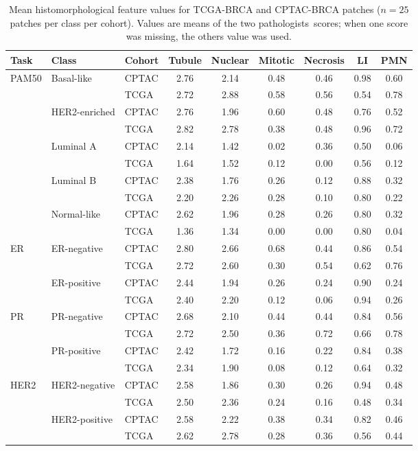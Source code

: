 \begin{table}[htbp]
\tiny
\centering
\caption{Mean histomorphological feature values for TCGA-BRCA and CPTAC-BRCA patches ($n=25$ patches per class per cohort). Values are means of the two pathologists\textquotesingle\ scores; when one score was missing, the other\textquotesingle s value was used.}
\label{tab:both-cohorts-means}
\begin{tabular}{lllcccccc}
\toprule
\textbf{Task} & \textbf{Class} & \textbf{Cohort} & \textbf{Tubule} & \textbf{Nuclear} & \textbf{Mitotic} & \textbf{Necrosis} & \textbf{LI} & \textbf{PMN} \\
\midrule
 \multirow{10}{*}{PAM50} & \multirow{2}{*}{Basal-like} & CPTAC & 2.76 & 2.14 & 0.48 & 0.46 & 0.98 & 0.60 \\
  &  & TCGA & 2.72 & 2.88 & 0.58 & 0.56 & 0.54 & 0.78 \\
   & \multirow{2}{*}{HER2-enriched} & CPTAC & 2.76 & 1.96 & 0.60 & 0.48 & 0.76 & 0.52 \\
  &  & TCGA & 2.82 & 2.78 & 0.38 & 0.48 & 0.96 & 0.72 \\
   & \multirow{2}{*}{Luminal A} & CPTAC & 2.14 & 1.42 & 0.02 & 0.36 & 0.50 & 0.06 \\
  &  & TCGA & 1.64 & 1.52 & 0.12 & 0.00 & 0.56 & 0.12 \\
   & \multirow{2}{*}{Luminal B} & CPTAC & 2.38 & 1.76 & 0.26 & 0.12 & 0.88 & 0.32 \\
  &  & TCGA & 2.20 & 2.26 & 0.28 & 0.10 & 0.80 & 0.22 \\
   & \multirow{2}{*}{Normal-like} & CPTAC & 2.62 & 1.96 & 0.28 & 0.26 & 0.80 & 0.32 \\
  &  & TCGA & 1.36 & 1.34 & 0.00 & 0.00 & 0.80 & 0.04 \\
\midrule
 \multirow{4}{*}{ER} & \multirow{2}{*}{ER-negative} & CPTAC & 2.80 & 2.66 & 0.68 & 0.44 & 0.86 & 0.54 \\
  &  & TCGA & 2.72 & 2.60 & 0.30 & 0.54 & 0.62 & 0.76 \\
   & \multirow{2}{*}{ER-positive} & CPTAC & 2.44 & 1.94 & 0.26 & 0.24 & 0.90 & 0.24 \\
  &  & TCGA & 2.40 & 2.20 & 0.12 & 0.06 & 0.94 & 0.26 \\
\midrule
 \multirow{4}{*}{PR} & \multirow{2}{*}{PR-negative} & CPTAC & 2.68 & 2.10 & 0.44 & 0.44 & 0.84 & 0.56 \\
  &  & TCGA & 2.72 & 2.50 & 0.36 & 0.72 & 0.66 & 0.78 \\
   & \multirow{2}{*}{PR-positive} & CPTAC & 2.42 & 1.72 & 0.16 & 0.22 & 0.84 & 0.38 \\
  &  & TCGA & 2.34 & 1.90 & 0.08 & 0.12 & 0.64 & 0.32 \\
\midrule
 \multirow{4}{*}{HER2} & \multirow{2}{*}{HER2-negative} & CPTAC & 2.58 & 1.86 & 0.30 & 0.26 & 0.94 & 0.48 \\
  &  & TCGA & 2.50 & 2.36 & 0.24 & 0.16 & 0.48 & 0.34 \\
   & \multirow{2}{*}{HER2-positive} & CPTAC & 2.58 & 2.22 & 0.38 & 0.34 & 0.82 & 0.46 \\
  &  & TCGA & 2.62 & 2.78 & 0.28 & 0.36 & 0.56 & 0.44 \\
\bottomrule
\end{tabular}
\end{table}